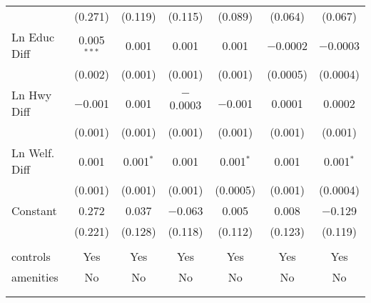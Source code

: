 \begin{table}[!htbp]
\begin{tabular}{@{\extracolsep{5pt}}lcccccc}
  & (0.271) & (0.119) & (0.115) & (0.089) & (0.064) & (0.067) \\ 
  Ln Educ Diff & 0.005$^{***}$ & 0.001 & 0.001 & 0.001 & $-$0.0002 & $-$0.0003 \\ 
  & (0.002) & (0.001) & (0.001) & (0.001) & (0.0005) & (0.0004) \\ 
  Ln Hwy Diff & $-$0.001 & 0.001 & $-$0.0003 & $-$0.001 & 0.0001 & 0.0002 \\ 
  & (0.001) & (0.001) & (0.001) & (0.001) & (0.001) & (0.001) \\ 
  Ln Welf. Diff & 0.001 & 0.001$^{*}$ & 0.001 & 0.001$^{*}$ & 0.001 & 0.001$^{*}$ \\ 
  & (0.001) & (0.001) & (0.001) & (0.0005) & (0.001) & (0.0004) \\ 
  Constant & 0.272 & 0.037 & $-$0.063 & 0.005 & 0.008 & $-$0.129 \\ 
  & (0.221) & (0.128) & (0.118) & (0.112) & (0.123) & (0.119) \\ 
 \hline \\[-1.8ex] 
controls & Yes & Yes & Yes & Yes & Yes & Yes \\ 
amenities & No & No & No & No & No & No \\ 
\hline \\[-1.8ex] 
\hline 
\hline \\[-1.8ex] 
\end{tabular} 
\end{table} 
